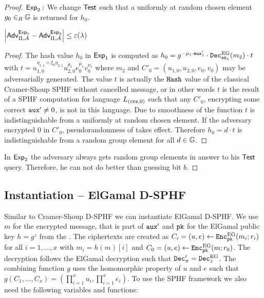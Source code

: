 \begin{proof}
\noindent$\mathsf{Exp}_2:$
We change $\mathsf{Test}$ such that a uniformly at random chosen element $g_0\in_R\mathbb{G}$ is returned for $h_0$.

\begin{claim}
$\left|\mathsf{Adv}_{\Pi,\mathcal{A}}^{\mathsf{Exp}_1}-\mathsf{Adv}_{\Pi,\mathcal{A}}^{\mathsf{Exp}_2}\right|\leq\varepsilon(\lambda)$
\end{claim}

\begin{proof}
The hash value $h_0$ in $\mathsf{Exp}_1$ is computed as $h_0=g^{-\mu_1\cdot\mathtt{aux}'_1}\cdot\mathtt{Dec}_{\mathtt{sk}_1}^{\mathrm{EG}}(m_2)\cdot t$ with $t=u_{1,0}^{\eta_{1,1}+\xi_0\eta_{2,1}}u_{2,0}^{\theta_1}\allowbreak e_0^{\mu_1}v_0^{\nu_1}$ where $m_2$ and $C'_0=(u_{1,0}, u_{2,0},\allowbreak e_0, v_0)$ may be adversarially generated.
The value $t$ is actually the $\mathtt{Hash}$ value of the classical Cramer-Shoup SPHF without cancelled message, or in other words $t$ is the result of a SPHF \Hash computation for language $L_{(\mathtt{crs},0)}$ such that any $C'_0$, encrypting some correct $\mathtt{aux}'\not=0$, is not in this language.
Due to smoothness of the \Hash function \cite{Benhamouda2013} $t$ is indistinguishable from a uniformly at random chosen element.
If the adversary encrypted $0$ in $C'_0$, pseudorandomness of \Hash takes effect.
Therefore $h_0=d\cdot t$ is indistinguishable from a random group element for all $d\in\mathbb{G}$.
\end{proof}

\noindent
In $\mathsf{Exp}_2$ the adversary always gets random group elements in answer to his $\mathsf{Test}$ query.
Therefore, he can not do better than guessing bit $b$.
\end{proof}

\subsection{Instantiation -- ElGamal D-SPHF}\label{app:elgamalsphff}
Similar to Cramer-Shoup \ac{D-SPHF} we can instantiate ElGamal \ac{D-SPHF}.
We use $m$ for the encrypted message, that is part of $\mathtt{aux}'$ and $\mathtt{pk}$ for the ElGamal public key $h=g^z$ from the \crs.
The ciphertexts are created as $C_i=(u,e)\gets\mathtt{Enc}^{\mathrm{EG}}_{\mathtt{pk}}(m_i;r_i)$ for all $i=1,\dots,x$ with $m_i=h(m)[i]$ and $C_0=(u,e)\gets\mathtt{Enc}^{\mathrm{EG}}_{\mathtt{pk}}(m;r_0)$.
The decryption follows the ElGamal decryption such that $\mathtt{Dec}'_\pi=\mathtt{Dec}^{\mathrm{EG}}_z$.
The combining function $g$ uses the homomorphic property of $u$ and $e$ such that $g(C_1,\dots,C_x)=(\prod^x_{i=1}u_{i},\prod^x_{i=1}e_i)$.
To use the \ac{SPHF} framework we also need the following variables and functions:


